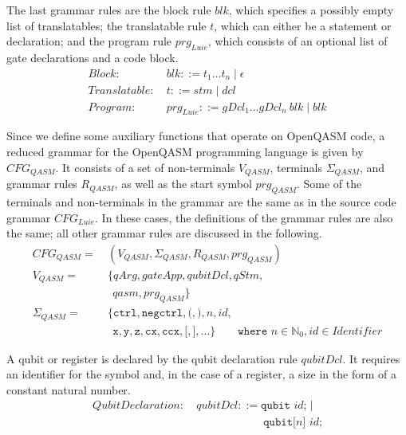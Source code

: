The last grammar rules are the block rule $blk$, which specifies a possibly empty list of translatables; the translatable rule $t$, which can either be a statement or declaration; and the program rule $prg_{Luie}$, which consists of an optional list of gate declarations and a code block.
\begin{align*}
    Block: \ & blk::= t_1 \dots t_n \mid \epsilon\\
    Translatable : \ & t::= stm \mid dcl\\
    Program: \ & prg_{Luie} ::= gDcl_1 \dots gDcl_n \ blk \mid blk 
\end{align*}

Since we define some auxiliary functions that operate on OpenQASM code, a reduced grammar for the OpenQASM programming language is given by $CFG_{QASM}$. It consists of a set of non-terminals $V_{QASM}$, terminals $\Sigma_{QASM}$, and grammar rules $R_{QASM}$, as well as the start symbol $prg_{QASM}$. Some of the terminals and non-terminals in the grammar are the same as in the source code grammar $CFG_{Luie}$. In these cases, the definitions of the grammar rules are also the same; all other grammar rules are discussed in the following.
\begin{align*}
    CFG_{QASM} = \ & (V_{QASM}, \Sigma_{QASM}, R_{QASM}, prg_{QASM} )\\ 
    V_{QASM} = \ & \{ qArg, gateApp, qubitDcl, qStm,\\ 
            & \ \  qasm, prg_{QASM}\}\\ 
    \Sigma_{QASM} = \ & \{\texttt{ctrl}, \texttt{negctrl}, \texttt{(}, \texttt{)}, n, id,  \\
               & \ \ \texttt{x}, \texttt{y}, \texttt{z}, \texttt{cx}, \texttt{ccx}, \texttt{[}, \texttt{]}, \dots \}  
               \quad \quad \texttt{where } n \in \mathbb{N}_0, id \in Identifier
\end{align*}

A qubit or register is declared by the qubit declaration rule $qubitDcl$. It requires an identifier for the symbol and, in the case of a register, a size in the form of a constant natural number. 
\begin{align*}
    QubitDeclaration: \ & qubitDcl::= \texttt{qubit } id \texttt{;} \mid\\
    & \hspace{6em} \texttt{qubit[}n\texttt{] } id \texttt{;}
\end{align*}

